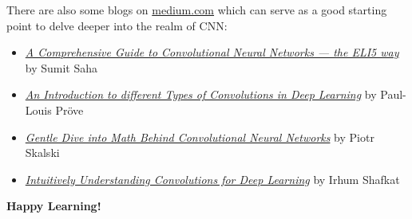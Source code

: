 \documentclass[a4paper,12pt]{book} %
\begin{document}
There are also some blogs on \url{medium.com} which can serve as a good starting point to delve deeper into the realm of CNN:
\begin{itemize}
    \item \href{https://towardsdatascience.com/a-comprehensive-guide-to-convolutional-neural-networks-the-eli5-way-3bd2b1164a53}{\textit{A Comprehensive Guide to Convolutional Neural Networks — the ELI5 way}} by Sumit Saha
    \item \href{https://towardsdatascience.com/types-of-convolutions-in-deep-learning-717013397f4d}{\textit{An Introduction to different Types of Convolutions in Deep Learning}} by Paul-Louis Pröve
    \item \href{https://towardsdatascience.com/gentle-dive-into-math-behind-convolutional-neural-networks-79a07dd44cf9}{\textit{Gentle Dive into Math Behind Convolutional Neural Networks}} by Piotr Skalski
    \item \href{https://towardsdatascience.com/intuitively-understanding-convolutions-for-deep-learning-1f6f42faee1}{\textit{Intuitively Understanding Convolutions for Deep Learning}} by Irhum Shafkat
\end{itemize}

\setlength{\parskip}{5em} \textbf{Happy Learning!}
\end{document}
